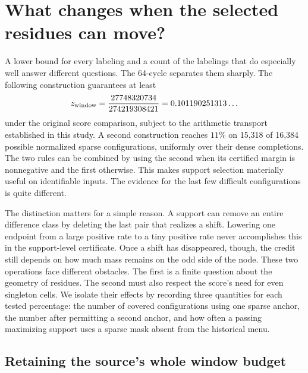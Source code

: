 \section{What changes when the selected residues can move?}
\label{sec:lower-support}

A lower bound for every labeling and a count of the labelings that do especially well answer different questions. The 64-cycle separates them sharply. The following construction guarantees at least
\[
             z_{\rm window}=\frac{27748320734}{274219308421}
                      =0.101190251313\ldots
\]
under the original score comparison, subject to the arithmetic transport established in this study. A second construction reaches \(11\%\) on 15,318 of 16,384 possible normalized sparse configurations, uniformly over their dense completions. The two rules can be combined by using the second when its certified margin is nonnegative and the first otherwise. This makes support selection materially useful on identifiable inputs. The evidence for the last few difficult configurations is quite different.

The distinction matters for a simple reason. A support can remove an entire difference class by deleting the last pair that realizes a shift. Lowering one endpoint from a large positive rate to a tiny positive rate never accomplishes this in the support-level certificate. Once a shift has disappeared, though, the credit still depends on how much mass remains on the odd side of the node. These two operations face different obstacles. The first is a finite question about the geometry of residues. The second must also respect the score's need for even singleton cells. We isolate their effects by recording three quantities for each tested percentage: the number of covered configurations using one sparse anchor, the number after permitting a second anchor, and how often a passing maximizing support uses a sparse mask absent from the historical menu.

\subsection{Retaining the source's whole window budget}

